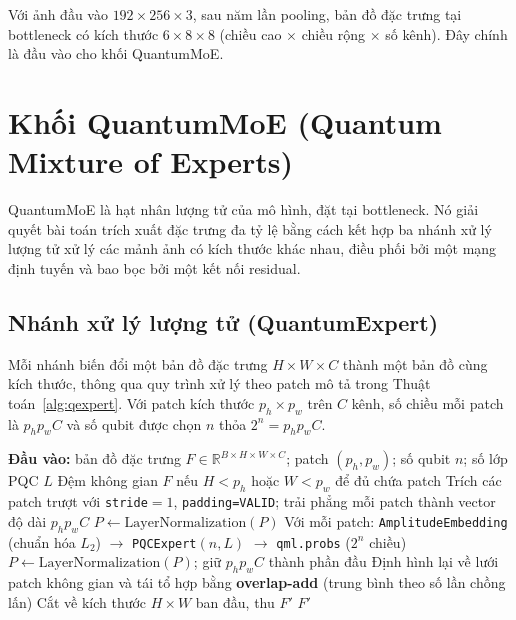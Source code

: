 Với ảnh đầu vào $192 \times 256 \times 3$, sau năm lần pooling, bản đồ đặc trưng tại bottleneck có kích thước $6 \times 8 \times 8$ (chiều cao $\times$ chiều rộng $\times$ số kênh). Đây chính là đầu vào cho khối QuantumMoE.

\section{Khối QuantumMoE (Quantum Mixture of Experts)}
QuantumMoE là hạt nhân lượng tử của mô hình, đặt tại bottleneck. Nó giải quyết bài toán trích xuất đặc trưng đa tỷ lệ bằng cách kết hợp ba nhánh xử lý lượng tử xử lý các mảnh ảnh có kích thước khác nhau, điều phối bởi một mạng định tuyến và bao bọc bởi một kết nối residual.

\subsection{Nhánh xử lý lượng tử (QuantumExpert)}
Mỗi nhánh biến đổi một bản đồ đặc trưng $H\times W\times C$ thành một bản đồ cùng kích thước, thông qua quy trình xử lý theo patch mô tả trong Thuật toán~\ref{alg:qexpert}. Với patch kích thước $p_h \times p_w$ trên $C$ kênh, số chiều mỗi patch là $p_h p_w C$ và số qubit được chọn $n$ thỏa $2^{n} = p_h p_w C$.

\begin{algorithm}[h]
\caption{Nhánh xử lý lượng tử \texttt{QuantumExpert}}
\label{alg:qexpert}
\begin{algorithmic}[1]
\State \textbf{Đầu vào:} bản đồ đặc trưng $F \in \mathbb{R}^{B\times H\times W\times C}$; patch $(p_h, p_w)$; số qubit $n$; số lớp PQC $L$
\State Đệm không gian $F$ nếu $H < p_h$ hoặc $W < p_w$ để đủ chứa patch
\State Trích các patch trượt với \texttt{stride}$=1$, \texttt{padding=VALID}; trải phẳng mỗi patch thành vector độ dài $p_h p_w C$
\State $P \gets \text{LayerNormalization}(P)$ 
\State Với mỗi patch: \texttt{AmplitudeEmbedding} (chuẩn hóa $L_2$) $\rightarrow$ \texttt{PQCExpert}$(n, L)$ $\rightarrow$ \texttt{qml.probs} ($2^n$ chiều)
\State $P \gets \text{LayerNormalization}(P)$; giữ $p_h p_w C$ thành phần đầu 
\State Định hình lại về lưới patch không gian và tái tổ hợp bằng \textbf{overlap-add} (trung bình theo số lần chồng lấn)
\State Cắt về kích thước $H\times W$ ban đầu, thu $F'$
\State \Return $F'$
\end{algorithmic}
\end{algorithm}

